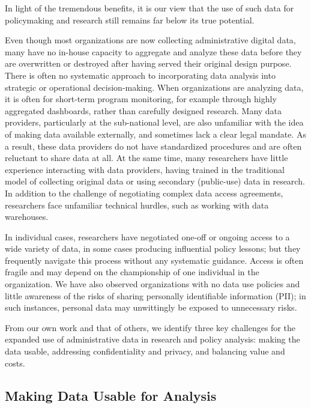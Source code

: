 \documentclass[
]{book}
\begin{document}
In light of the tremendous benefits, it is our view that the use of such data for policymaking and research still remains far below its true potential.

Even though most organizations are now collecting administrative digital data, many have no in-house capacity to aggregate and analyze these data before they are overwritten or destroyed after having served their original design purpose. There is often no systematic approach to incorporating data analysis into strategic or operational decision-making. When organizations are analyzing data, it is often for short-term program monitoring, for example through highly aggregated dashboards, rather than carefully designed research. Many data providers, particularly at the sub-national level, are also unfamiliar with the idea of making data available externally, and sometimes lack a clear legal mandate. As a result, these data providers do not have standardized procedures and are often reluctant to share data at all. At the same time, many researchers have little experience interacting with data providers, having trained in the traditional model of collecting original data or using secondary (public-use) data in research. In addition to the challenge of negotiating complex data access agreements, researchers face unfamiliar technical hurdles, such as working with data warehouses.

In individual cases, researchers have negotiated one-off or ongoing access to a wide variety of data, in some cases producing influential policy lessons; but they frequently navigate this process without any systematic guidance. Access is often fragile and may depend on the championship of one individual in the organization. We have also observed organizations with no data use policies and little awareness of the risks of sharing personally identifiable information (PII); in such instances, personal data may unwittingly be exposed to unnecessary risks.

From our own work and that of others, we identify three key challenges for the expanded use of administrative data in research and policy analysis: making the data usable, addressing confidentiality and privacy, and balancing value and costs.

\hypertarget{making-data-usable-for-analysis}{%
\subsection{Making Data Usable for Analysis}\label{making-data-usable-for-analysis}}
\end{document}
